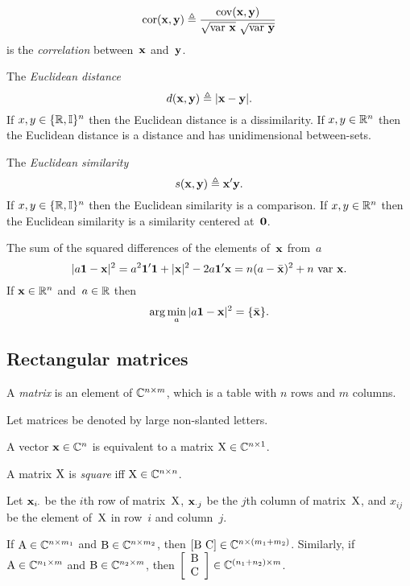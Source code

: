\documentclass[10pt,a4paper]{article}
\theoremstyle{plain} \newtheorem{Lem}{Lemma}
\begin{document}
$$ \mathrm {cor} (\mathbf x, \mathbf y) \triangleq \frac {\mathrm {cov} (\mathbf x, \mathbf y)} {\sqrt{\mathrm {var} \  \mathbf x} \ \sqrt{\mathrm {var} \  \mathbf y}} $$
is the {\em correlation} between~$\mathbf x$ and~$\mathbf y$.

The {\em Euclidean distance} $$d(\mathbf x, \mathbf y) \triangleq |\mathbf x - \mathbf y|.$$
If $x,y \in \{\mathbb R,\mathbb I\}^n$ then the Euclidean distance is a dissimilarity.
If $x,y \in \mathbb R^n$ then the Euclidean distance is a distance and has unidimensional between-sets.

The {\em Euclidean similarity} $$s(\mathbf x, \mathbf y) \triangleq \mathbf x' \mathbf y.$$
If $x,y \in \{\mathbb R,\mathbb I\}^n$ then the Euclidean similarity is a comparison.
If $x,y \in \mathbb R^n$ then the Euclidean similarity is a similarity centered at~$\mathbf 0$.

The sum of the squared differences of the elements of~$\mathbf x$ from~$a$
\begin{equation} \label{sqDiff}
|a \mathbf 1 - \mathbf x|^2 = a^2 \mathbf 1' \mathbf 1 + |\mathbf x|^2 - 2a\mathbf 1' \mathbf x = n (a - \bar {\mathbf x})^2 + n \ \mathrm {var} \  \mathbf x.
\end{equation}
If $\mathbf x \in \mathbb R^n$ and~$a \in \mathbb R$ then
\begin{equation} \label{centerL2}
  \arg \min_a |a \mathbf 1 - \mathbf x|^2 = \{\bar {\mathbf x} \}.
\end{equation}






\subsection{Rectangular matrices}

A {\em matrix} is an element of $\mathbb C^{n \times m}$, which is a table with $n$ rows and $m$ columns.

Let matrices be denoted by large non-slanted letters.

A vector $\mathbf x \in \mathbb C^n$ is equivalent to a matrix $\mathrm X \in \mathbb C^{n \times 1}$.

A matrix $\mathrm X$ is {\em square} iff $\mathrm X \in \mathbb C^{n \times n}$.

Let $\mathbf x_{i \cdot }$ be the $i$th row of matrix~$\mathrm X$,
$\mathbf x_{\cdot j}$ be the $j$th column of matrix~$\mathrm X$,
and $x_{ij}$ be the element of~$\mathrm X$ in row~$i$ and column~$j$.

If $\mathrm A \in \mathbb C^{n \times m_1}$ and $\mathrm B \in \mathbb C^{n \times m_2}$, then $[\mathrm B \ \mathrm C] \in \mathbb C^{n \times (m_1 + m_2)}$.
Similarly,
if $\mathrm A \in \mathbb C^{n_1 \times m}$ and $\mathrm B \in \mathbb C^{n_2 \times m}$, then $\left[ \begin{array}{c} \mathrm B \\ \mathrm C \end{array} \right] \in \mathbb C^{(n_1 + n_2) \times m}$.
\end{document}
